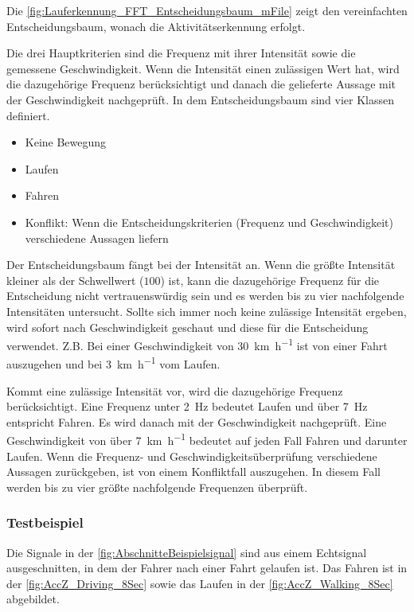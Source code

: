 Die \autoref{fig:Lauferkennung_FFT_Entscheidungsbaum_mFile} zeigt den vereinfachten Entscheidungsbaum, wonach die Aktivitäts\-erkennung erfolgt.

Die drei Hauptkriterien sind die Frequenz mit ihrer Intensität sowie die gemessene Geschwindigkeit. Wenn die Intensität einen zulässigen Wert hat, wird die dazugehörige Frequenz berücksichtigt und danach die gelieferte Aussage mit der Geschwindigkeit nachgeprüft.
In dem Entscheidungsbaum sind vier Klassen definiert.
\begin{itemize}
	\item Keine Bewegung
	\item Laufen
	\item Fahren
	\item Konflikt: Wenn die Entscheidungskriterien (Frequenz und Geschwindigkeit) verschiedene Aussagen liefern
\end{itemize}
Der Entscheidungsbaum fängt bei der Intensität an. Wenn die größte Intensität kleiner als der Schwellwert ($100$) ist, kann die dazugehörige Frequenz für die Entscheidung nicht vertrauenswürdig sein und es werden bis zu vier nachfolgende Intensitäten untersucht. Sollte sich immer noch keine zulässige Intensität ergeben, wird sofort nach Geschwindigkeit geschaut und diese für die Entscheidung verwendet.
Z.B. Bei einer Geschwindigkeit von \SI[per-mode = symbol]{30}{\kilo\meter\per\hour} ist von einer Fahrt auszugehen und bei \SI[per-mode = symbol]{3}{\kilo\meter\per\hour} vom Laufen.

Kommt eine zulässige Intensität vor, wird die dazugehörige Frequenz berücksichtigt. Eine Frequenz unter \SI{2}{\hertz} bedeutet \glqq Laufen\grqq{} und über \SI{7}{\hertz} entspricht \glqq Fahren\grqq{}. Es wird danach mit der Geschwindigkeit nachgeprüft. Eine Geschwindigkeit von über \SI[per-mode = symbol]{7}{\kilo\meter\per\hour} bedeutet auf jeden Fall \glqq Fahren\grqq{} und darunter \glqq Laufen\grqq{}.
Wenn die Frequenz- und Geschwindigkeitsüberprüfung verschiedene Aussagen zurückgeben, ist von einem Konfliktfall auszugehen. In diesem Fall werden bis zu vier größte nachfolgende Frequenzen überprüft.


\subsubsection{Testbeispiel}
Die Signale in der \autoref{fig:AbschnitteBeispielsignal} sind aus einem Echtsignal ausgeschnitten, in dem der Fahrer nach einer Fahrt gelaufen ist. Das Fahren ist in der \autoref{fig:AccZ_Driving_8Sec} sowie das Laufen in der \autoref{fig:AccZ_Walking_8Sec} abgebildet.


